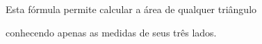 \documentclass[preview]{standalone}
\begin{document}
\begin{center}
\textbullet\; Esta fórmula permite calcular a área de qualquer triângulo\\\phantom{\textbullet\;} conhecendo apenas as medidas de seus três lados.
\end{center}
\end{document}
